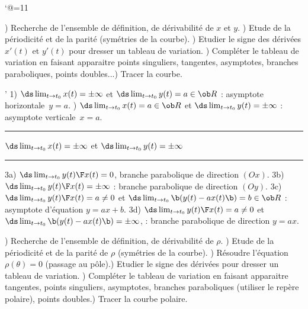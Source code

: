 \catcode`@=11\relax



\vglue-10mm
\bigskip

\Methode [Courbe paramétrée cartésienne {$\vec {OM}(t) = x(t)\vec i+y(t)\vec j$}]
\medskip{}) Recherche de l'ensemble de définition, de dérivabilité de $x$ et $y$. \PAR{}) Etude de la périodicité et de la parité (symétries de la courbe). \PAR{}) Etudier le signe des dérivées $x'(t)$ et $y'(t)$ pour dresser un tableau de variation. \PAR{}) Compléter le tableau de variation en faisant apparaitre points singuliers, tangentes, asymptotes,
branches paraboliques, points doubles...\PAR{}) Tracer la courbe.

\def\LD@Maths@Solution@Text{%
}%



\Methode [Branche infinie en $t_0$ d'une courbe  paramétrée cartésienne {$\vec {OM} (t)= x(t)\vec i+y(t)\vec j$}]
\medskip\noindent'
1) $\ds\lim_{t\to t_0}x(t)=\pm\infty$ et $\ds\lim_{t\to t_0}y(t)=a\in\ob R$ : asymptote horizontale~$y=a$. 
\PAR{}) $\ds\lim_{t\to t_0}x(t)=a\in\ob R$ et $\ds\lim_{t\to t_0}y(t)=\pm\infty$ : asymptote verticale~$x=a$. 
\PAR\noindent
\smallskip\noindent\hrule\smallskip
\centerline{$\ds\lim_{t\to t_0}x(t)=\pm\infty$ et $\ds\lim_{t\to t_0}y(t)=\pm\infty$}
\PAR\noindent\hrule\smallskip\noindent
3a) $\ds \lim_{t\to t_0}{y(t)\F x(t)}=0$, branche parabolique de direction $(Ox)$. 
\PAR\noindent
3b) $\ds \lim_{t\to t_0}{y(t)\F x(t)}=\pm\infty$ : branche parabolique de direction $(Oy)$.
\PAR\noindent
3c) $\ds \lim_{t\to t_0}{y(t)\F x(t)}=a\neq0$ et $\ds\lim_{t\to t_0}\b(y(t)-ax(t)\b)=b\in\ob R$ : asymptote d'équation $y=ax+b$. 
\PAR\noindent
3d) $\ds \lim_{t\to t_0}{y(t)\F x(t)}=a\neq0$ et $\ds\lim_{t\to t_0}\b(y(t)-ax(t)\b)=\pm\infty$, : branche  parabolique de direction $y=ax$. 
\medskip


\Methode [Courbe paramétrée polaire {$\vec {OM}(\theta) = \rho(\theta)\vec u$}]
\medskip{}) Recherche de l'ensemble de définition, de dérivabilité de $\rho$. \PAR{}) Etude de la périodicité et de la parité de $\rho$ (symétries de la courbe). \PAR{}) Résoudre l'équation $\rho(\theta)=0$ (passage au pôle).\PAR{}) Etudier le signe des dérivées pour dresser un tableau de variation. \PAR{}) Compléter le tableau de variation en faisant apparaitre  tangentes, points singuliers, asymptotes,
branches paraboliques (utiliser le repère polaire), points doubles.\PAR{}) Tracer la courbe polaire.

